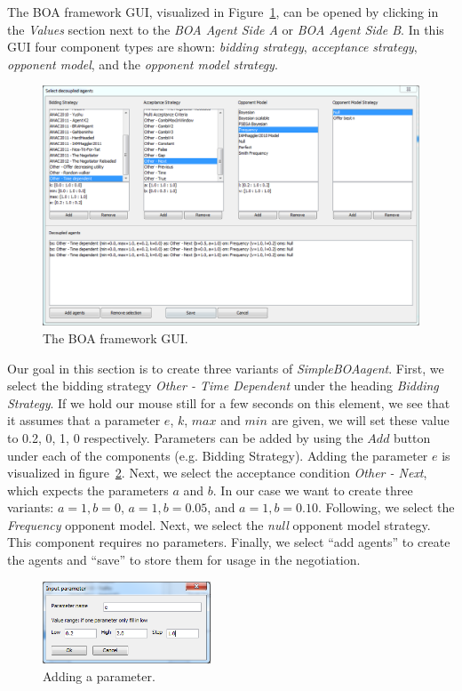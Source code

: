 \documentclass[]{article}
\begin{document}
The BOA framework GUI, visualized in Figure~\ref{fig:decoupledGUI}, can be opened by clicking in the \textit{Values} section next to the \textit{BOA Agent Side A} or \textit{BOA Agent Side B}. In this GUI four component types are shown: \textit{bidding strategy}, \textit{acceptance strategy}, \textit{opponent model}, and the \textit{opponent model strategy}.

\begin{figure}[h!]
	\center
	\includegraphics[width=15cm]{media/Decoupled_DecoupledGUI.png}
	\caption{The BOA framework GUI.}
	\label{fig:decoupledGUI}
\end{figure}

Our goal in this section is to create three variants of \textit{SimpleBOAagent}. First, we select the bidding strategy \textit{Other - Time Dependent} under the heading \textit{Bidding Strategy}.  If we hold our mouse still for a few seconds on this element, we see that it assumes that a parameter $e$, $k$, $max$ and $min$ are given, we will set these value to 0.2, 0, 1, 0 respectively. Parameters can be added by using the $Add$ button under each of the components (e.g. Bidding Strategy). Adding the parameter $e$ is visualized in figure~\ref{fig:decoupledparam}. Next, we select the acceptance condition \textit{Other - Next}, which expects the parameters $a$ and $b$. In our case we want to create three variants: $a=1, b=0$, $a=1, b=0.05$, and $a=1, b=0.10$. Following, we select the \textit{Frequency} opponent model. Next, we select the \textit{null} opponent model strategy. This component requires no parameters. Finally, we select ``add agents'' to create the agents and ``save'' to store them for usage in the negotiation.

\begin{figure}[h!] 
	\center
	\includegraphics[width=5cm]{media/Decoupled_Param.png}
	\caption{Adding a parameter.}
	\label{fig:decoupledparam}
\end{figure}
\end{document}
